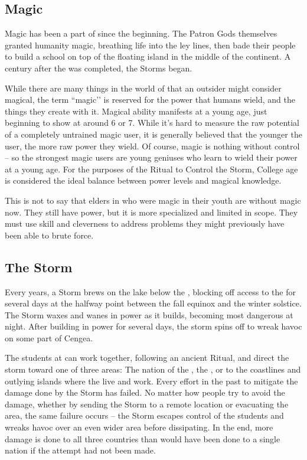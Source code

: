 \documentclass[blue]{GL2020}
\begin{document}
\subsection*{Magic}
Magic has been a part of \pEarth{} since the beginning. The Patron Gods themselves granted humanity magic, breathing life into the ley lines, then bade their people to build a school on top of the floating island in the middle of the continent. A century after the \pSchool{} was completed, the Storms began.

While there are many things in the world of \pEarth{} that an outsider might consider magical, the term ``magic’’ is reserved for the power that humans wield, and the things they create with it. Magical ability manifests at a young age, just beginning to show at around 6 or 7. While it’s hard to measure the raw potential of a completely untrained magic user, it is generally believed that the younger the user, the more raw power they wield. Of course, magic is nothing without control -- so the strongest magic users are young geniuses who learn to wield their power at a young age. For the purposes of the Ritual to Control the Storm, College age is considered the ideal balance between power levels and magical knowledge. 

This is not to say that elders in \pEarth{} who were magic in their youth are without magic now. They still have power, but it is more specialized and limited in scope. They must use skill and cleverness to address problems they might previously have been able to brute force.

\subsection*{The Storm}
Every \pCycle{} years, a Storm brews on the lake below the \pSc{}, blocking off access to the \pSc{} for several days at the halfway point between the fall equinox and the winter solstice. The Storm waxes and wanes in power as it builds, becoming most dangerous at night. After building in power for several days, the storm spins off to wreak havoc on some part of Cengea. 

The students at \pSchool{} can work together, following an ancient Ritual, and direct the storm toward one of three areas: The nation of the \pFarm{}, the \pTech{}, or to the coastlines and outlying islands where the \pShippies{} live and work. Every effort in the past to mitigate the damage done by the Storm has failed. No matter how people try to avoid the damage, whether by sending the Storm to a remote location or evacuating the area, the same failure occurs -- the Storm escapes control of the students and wreaks havoc over an even wider area before dissipating. In the end, more damage is done to all three countries than would have been done to a single nation if the attempt had not been made. 
\end{document}
